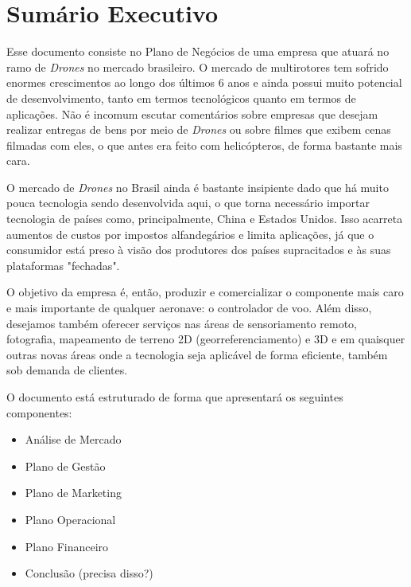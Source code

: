 \section{Sumário Executivo}

Esse documento consiste no Plano de Negócios de uma empresa que atuará
no ramo de \emph{Drones} no mercado brasileiro. O mercado de multirotores
tem sofrido enormes crescimentos ao longo dos últimos 6 anos e ainda possui
muito potencial de desenvolvimento, tanto em termos tecnológicos quanto em
termos de aplicações. Não é incomum escutar comentários sobre empresas que
desejam realizar entregas de bens por meio de \emph{Drones} ou sobre filmes
que exibem cenas filmadas com eles, o que antes era feito com helicópteros,
de forma bastante mais cara.

O mercado de \emph{Drones} no Brasil ainda é bastante insipiente dado que
há muito pouca tecnologia sendo desenvolvida aqui, o que torna necessário
importar tecnologia de países como, principalmente, China e Estados Unidos.
Isso acarreta aumentos de custos por impostos alfandegários e limita
aplicações, já que o consumidor está preso à visão dos produtores dos países
supracitados e às suas plataformas "fechadas".

O objetivo da empresa é, então, produzir e comercializar o componente mais caro 
e mais importante de qualquer aeronave: o controlador de voo. Além disso, desejamos
também oferecer serviços nas áreas de sensoriamento remoto, fotografia, mapeamento
de terreno 2D (georreferenciamento) e 3D e em quaisquer outras novas áreas onde
a tecnologia seja aplicável de forma eficiente, também sob demanda de clientes.

O documento está estruturado de forma que apresentará os seguintes componentes:

\begin{itemize}
	\item Análise de Mercado
	\item Plano de Gestão
	\item Plano de Marketing
	\item Plano Operacional
	\item Plano Financeiro
	\item Conclusão (precisa disso?)
\end{itemize}


